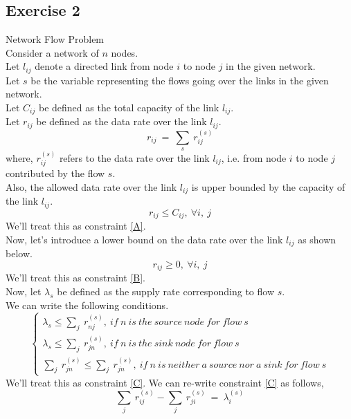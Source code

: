 \documentclass[12pt, draftcls, onecolumn]{IEEEtran}
\begin{document}
\subsection{Exercise 2}
Network Flow Problem
\\Consider a network of $n$ nodes. 
\\Let $l_{ij}$ denote a directed link from node $i$ to node $j$ in the given network.
\\Let $s$ be the variable representing the flows going over the links in the given network.
\\Let $C_{ij}$ be defined as the total capacity of the link $l_{ij}$.
\\Let $r_{ij}$ be defined as the data rate over the link $l_{ij}$.
\[r_{ij}\ =\ \sum_{s}\ r_{ij}^{(s)}\]
where,
$r_{ij}^{(s)}$ refers to the data rate over the link $l_{ij}$, i.e. from node $i$ to node $j$ contributed by the flow $s$.
\\Also, the allowed data rate over the link $l_{ij}$ is upper bounded by the capacity of the link $l_{ij}$.
\begin{equation}\label{A}
    r_{ij} \leq C_{ij},\ \forall i,\ j \tag{A}
\end{equation}
We'll treat this as constraint \eqref{A}.
\\Now, let's introduce a lower bound on the data rate over the link $l_{ij}$ as shown below.
\begin{equation}\label{B}
    r_{ij} \geq 0,\ \forall i,\ j \tag{B}
\end{equation}
We'll treat this as constraint \eqref{B}.
\\Now, let $\lambda_s$ be defined as the supply rate corresponding to flow $s$.
\\We can write the following conditions.
\begin{equation}\label{C}
    \begin{cases}
        \lambda_s \leq \sum_j\ r_{nj}^{(s)},\ if\ n\ is\ the\ source\ node\ for\ flow\ s\\
        \lambda_s \leq \sum_j\ r_{jn}^{(s)},\ if\ n\ is\ the\ sink\ node\ for\ flow\ s\\
        \sum_j\ r_{jn}^{(s)} \leq \sum_j\ r_{jn}^{(s)},\ if\ n\ is\ neither\ a\ source\ nor\ a\ sink\ for\ flow\ s\tag{C}
    \end{cases}
\end{equation}
We'll treat this as constraint \eqref{C}.
We can re-write constraint \eqref{C} as follows,
\begin{equation}\label{C*}
    \sum_j\ r_{ij}^{(s)} - \sum_j\ r_{ji}^{(s)}\ =\ \lambda_i^{(s)}\tag{C*}
\end{equation}
\end{document}

